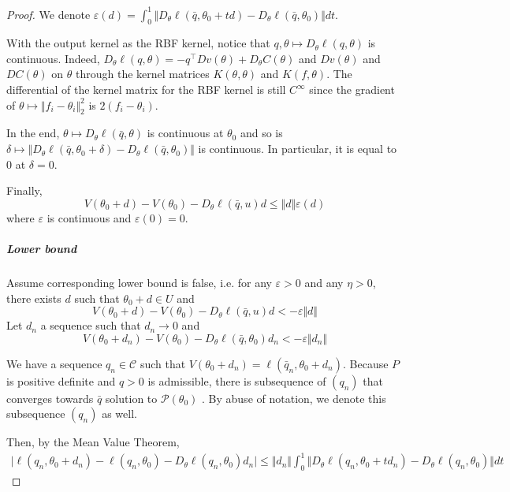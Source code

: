 \begin{proof}
We denote $\varepsilon(d)= \int_0^1 \Vert D_\theta\ell(\bar q, \theta_0 +td) - D_\theta\ell(\bar q, \theta_0)\Vert dt$.

With the output kernel as the RBF kernel, notice that $q, \theta \mapsto D_\theta\ell(q, \theta)$ is continuous. Indeed, $D_\theta \ell(q, \theta) = -q^\top D v(\theta) + D_\theta C(\theta)$ and $D v(\theta)$ and $DC(\theta)$ on $\theta$ through the kernel matrices $K(\theta, \theta)$ and $K(f, \theta)$. The differential of the kernel matrix for the RBF kernel is still $C^\infty$ since the gradient of $\theta \mapsto \Vert f_i - \theta_i\Vert_2^2$ is $2(f_i - \theta_i)$.

In the end, $\theta \mapsto D_\theta\ell(\bar q, \theta)$ is continuous at $\theta_0$ and so is $ \delta \mapsto \Vert D_\theta\ell(\bar q, \theta_0 + \delta) -D_\theta\ell(\bar q, \theta_0)\Vert$ is continuous. In particular, it is equal to $0$ at $\delta=0$.

Finally,
   \begin{equation}
       V(\theta_0+d) - V(\theta_0) - D_\theta\ell(\bar q, u)d \leq \Vert d\Vert \varepsilon(d)
   \end{equation}
where $\varepsilon$ is continuous and $\varepsilon(0)=0$.


\subparagraph{Lower bound}
Assume corresponding lower bound is false, i.e. for any $\varepsilon>0$ and any $\eta >0$, there exists $d$ such that $\theta_0 + d\in U$ and
   \begin{equation}
       V(\theta_0+d) - V(\theta_0) - D_\theta\ell(\bar q, u)d < -\varepsilon\Vert d\Vert
   \end{equation}
    Let $d_n$ a sequence such that $d_n \to 0$ and
   \begin{equation}\label{eq:proof_hyp}
       V(\theta_0+d_n) - V(\theta_0) - D_\theta\ell(\bar q, \theta_0)d_n < -\varepsilon\Vert d_n\Vert
   \end{equation}

   We have a sequence $q_n\in \mathcal C$ such that $V(\theta_0+ d_n) = \ell(\bar q_n, \theta_0 + d_n)$. Because $P$ is positive definite and $q > 0$ is admissible, there is subsequence of $(q_n)$ that converges towards $\bar q$ solution to $\mathcal P(\theta_0)$ \citep[Lemma 14.4]{lee}. By abuse of notation, we denote this subsequence $(q_n)$ as well.

   Then, by the Mean Value Theorem,
   \begin{align}
       \vert \ell(q_n, \theta_0 + d_n) - \ell(q_n, \theta_0) - D_\theta \ell(q_n, \theta_0)d_n\vert \leq \Vert d_n\Vert \int_0^1 \Vert D_\theta \ell(q_n, \theta_0 + td_n) - D_\theta \ell(q_n, \theta_0)\Vert dt
   \end{align}


\end{proof}
